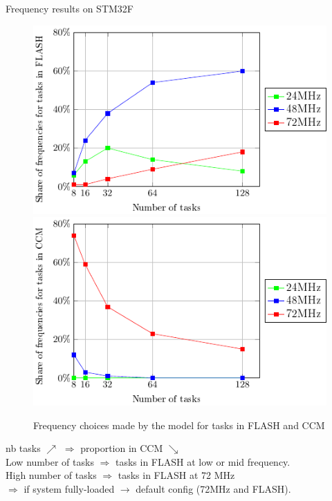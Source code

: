 \documentclass[
	11pt, %
]{beamer}
\begin{document}
\begin{frame}{Frequency results on STM32F}
	\begin{figure}
        \includegraphics[scale = 0.6]{data/model/frequency_choose.pdf}
		\includegraphics[scale = 0.6]{data/model/frequency_choose_CCM.pdf}
		\caption{Frequency choices made by the model for tasks in FLASH and CCM}
	\end{figure}
nb tasks $\nearrow$ $\Rightarrow $ proportion in CCM $\searrow$ \\
Low number of tasks $\Rightarrow $ tasks in FLASH at low or mid frequency. \\
High number of tasks $\Rightarrow $ tasks in FLASH  at 72 MHz \\
$\Rightarrow $ if system fully-loaded $\rightarrow$ default config (72MHz and FLASH).
\end{frame}
\end{document}
